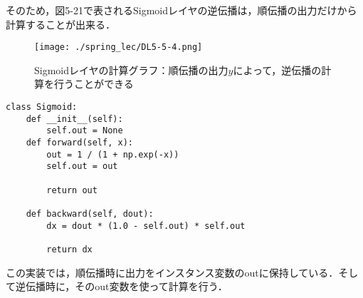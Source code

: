 \documentclass[dvipdfmx]{jsarticle}
\begin{document}
そのため，図5-21で表されるSigmoidレイヤの逆伝播は，順伝播の出力だけから計算することが出来る．

\begin{figure}[htbp]
\begin{center}
\texttt{[image: ./spring\_lec/DL5-5-4.png]}
\end{center}
\caption{Sigmoidレイヤの計算グラフ：順伝播の出力$y$によって，逆伝播の計算を行うことができる}
\end{figure}

\begin{lstlisting}[caption=Sigmoid, label=fuga]
class Sigmoid:
    def __init__(self):
        self.out = None
    def forward(self, x):
        out = 1 / (1 + np.exp(-x))
        self.out = out

        return out
    
    def backward(self, dout):
        dx = dout * (1.0 - self.out) * self.out

        return dx
\end{lstlisting}


この実装では，順伝播時に出力をインスタンス変数のoutに保持している．そして逆伝播時に，そのout変数を使って計算を行う．
\end{document}
